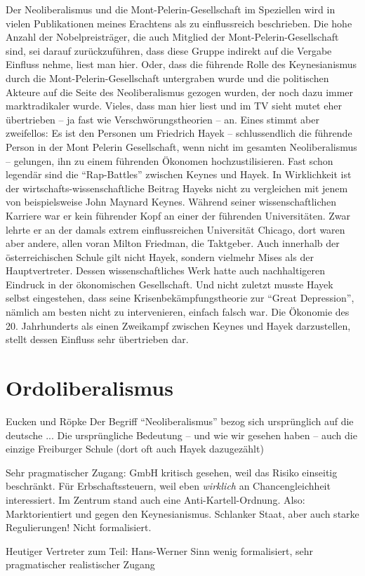 Der Neoliberalismus und die Mont-Pelerin-Gesellschaft im Speziellen wird in vielen Publikationen meines Erachtens als zu einflussreich beschrieben. Die hohe Anzahl der Nobelpreisträger, die auch Mitglied der Mont-Pelerin-Gesellschaft sind, sei darauf zurückzuführen, dass diese Gruppe indirekt auf die Vergabe Einfluss nehme, liest man hier. Oder, dass die führende Rolle des Keynesianismus durch die Mont-Pelerin-Gesellschaft untergraben wurde und die politischen Akteure auf die Seite des Neoliberalismus gezogen wurden, der noch dazu immer marktradikaler wurde. Vieles, dass man hier liest und im TV sieht mutet eher übertrieben -- ja fast wie Verschwörungstheorien -- an. Eines stimmt aber zweifellos: Es ist den Personen um Friedrich Hayek -- schlussendlich die führende Person in der Mont Pelerin Gesellschaft, wenn nicht im gesamten Neoliberalismus -- gelungen, ihn zu einem führenden Ökonomen hochzustilisieren. Fast schon legendär sind die "`Rap-Battles"' zwischen Keynes und Hayek. In Wirklichkeit ist der wirtschafts-wissenschaftliche Beitrag Hayeks nicht zu vergleichen mit jenem von beispielsweise John Maynard Keynes. Während seiner wissenschaftlichen Karriere war er kein führender Kopf an einer der führenden Universitäten. Zwar lehrte er an der damals extrem einflussreichen Universität Chicago, dort waren aber andere, allen voran Milton Friedman, die Taktgeber. Auch innerhalb der österreichischen Schule gilt nicht Hayek, sondern vielmehr Mises als der Hauptvertreter. Dessen wissenschaftliches Werk hatte auch nachhaltigeren Eindruck in der ökonomischen Gesellschaft. Und nicht zuletzt musste Hayek selbst eingestehen, dass seine Krisenbekämpfungstheorie zur "`Great Depression"', nämlich am besten nicht zu intervenieren, einfach falsch war. Die Ökonomie des 20. Jahrhunderts als einen Zweikampf zwischen Keynes und Hayek darzustellen, stellt dessen Einfluss sehr übertrieben dar.







\section{Ordoliberalismus}

Eucken und Röpke
Der Begriff "`Neoliberalismus"' bezog sich ursprünglich auf die deutsche ...
Die ursprüngliche Bedeutung -- und wie wir gesehen haben -- auch die einzige 
Freiburger Schule (dort oft auch Hayek dazugezählt)


Sehr pragmatischer Zugang: GmbH kritisch gesehen, weil das Risiko einseitig beschränkt. Für Erbschaftssteuern, weil eben \textit{wirklich} an Chancengleichheit interessiert. Im Zentrum stand auch eine Anti-Kartell-Ordnung.
Also: Marktorientiert und gegen den Keynesianismus. Schlanker Staat, aber auch starke Regulierungen!
Nicht formalisiert. 

Heutiger Vertreter zum Teil: Hans-Werner Sinn wenig formalisiert, sehr pragmatischer realistischer Zugang

